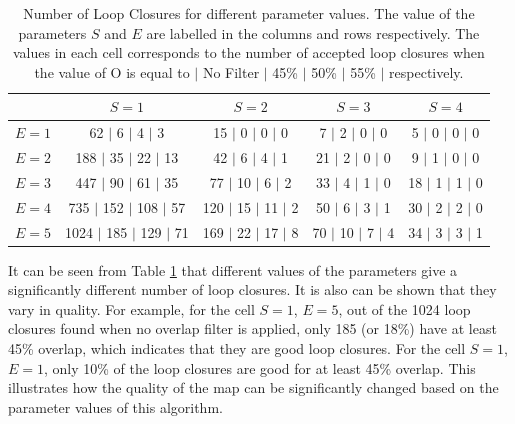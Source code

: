 \documentclass[11pt]{article}
\begin{document}
\begin{table}[h!]
	\vspace*{1cm}
	\centering
	\begin{tabular}{||c || c | c | c | c  ||} 
		\hline
		\textbf{} & \textbf{$S=1$} & \textbf{$S=2$} & \textbf{$S=3$} & \textbf{$S=4$}\\ [0.5ex] 
		\hline\hline
		\textbf{$E=1$} & \hphantom{00}62 $\vert$ \hphantom{00}6 $\vert$ \hphantom{00}4 $\vert$ \hphantom{0}3 & \hphantom{0}15 $\vert$ \hphantom{0}0 $\vert$ \hphantom{0}0 $\vert$ 0  & \hphantom{0}7 $\vert$ \hphantom{0}2 $\vert$ 0 $\vert$ 0 & \hphantom{0}5 $\vert$ 0 $\vert$ 0 $\vert$ 0 \\ 
		\textbf{$E=2$} & \hphantom{0}188 $\vert$ \hphantom{0}35 $\vert$ \hphantom{0}22 $\vert$ 13 & \hphantom{0}42 $\vert$ \hphantom{0}6 $\vert$ \hphantom{0}4 $\vert$ 1 & 21 $\vert$ \hphantom{0}2 $\vert$ 0 $\vert$ 0 & \hphantom{0}9 $\vert$ 1 $\vert$ 0 $\vert$ 0 \\
		\textbf{$E=3$} & \hphantom{0}447 $\vert$ \hphantom{0}90 $\vert$ \hphantom{0}61 $\vert$ 35 & \hphantom{0}77 $\vert$ 10 $\vert$ \hphantom{0}6 $\vert$ 2 & 33 $\vert$ \hphantom{0}4 $\vert$ 1 $\vert$ 0 & 18 $\vert$ 1 $\vert$ 1 $\vert$ 0 \\
		\textbf{$E=4$} & \hphantom{0}735 $\vert$ 152 $\vert$ 108 $\vert$ 57 & 120 $\vert$ 15 $\vert$ 11 $\vert$ 2 & 50 $\vert$ \hphantom{0}6 $\vert$ 3 $\vert$ 1 & 30 $\vert$ 2 $\vert$ 2 $\vert$ 0 \\
		\textbf{$E=5$} & 1024 $\vert$ 185 $\vert$ 129 $\vert$ 71 &  169 $\vert$ 22 $\vert$ 17 $\vert$ 8 & 70 $\vert$ 10 $\vert$ 7 $\vert$ 4 & 34 $\vert$ 3 $\vert$ 3 $\vert$ 1 \\ [1ex] 
		\hline
	\end{tabular}
	\caption{Number of Loop Closures for different parameter values. The value of the parameters $S$ and $E$ are labelled in the columns and rows respectively. The values in each cell corresponds to the number of accepted loop closures when the value of O is equal to $\vert$ No Filter $\vert$ 45\% $\vert$ 50\% $\vert$ 55\% $\vert$ respectively. }
	\label{table:LoopClosure}
\end{table}
	
It can be seen from Table \ref{table:LoopClosure} that different values of the parameters give a significantly different number of loop closures. It is also can be shown that they vary in quality. For example, for the cell $S=1$, $E=5$, out of the 1024 loop closures found when no overlap filter is applied, only 185 (or 18\%) have at least 45\% overlap, which indicates that they are good loop closures. For the cell $S=1$, $E=1$, only 10\% of the loop closures are good for at least 45\% overlap. This illustrates how the quality of the map can be significantly changed based on the parameter values of this algorithm.
\end{document}
